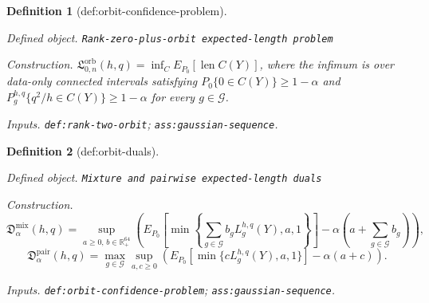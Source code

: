 \documentclass{article}
\newtheorem{definition}{Definition}
\begin{document}
\begin{definition}[def:orbit-confidence-problem]\label{def:orbit-confidence-problem}
\par\smallskip\noindent\emph{Defined object.} \texttt{Rank-\allowbreak{}zero-\allowbreak{}plus-\allowbreak{}orbit expected-\allowbreak{}length problem}
\par\smallskip\noindent\emph{Construction.} \(\mathfrak L_{0,n}^{\mathrm{orb}}(h,q)=\inf_C E_{P_0}[\operatorname{len}C(Y)]\), where the infimum is over data-only connected intervals satisfying \(P_0\{0\in C(Y)\}\ge1-\alpha\) and \(P_g^{h,q}\{q^2/h\in C(Y)\}\ge1-\alpha\) for every \(g\in\mathcal G\).
\par\smallskip\noindent\emph{Inputs.} \texttt{def:\allowbreak{}rank-\allowbreak{}two-\allowbreak{}orbit}; \texttt{ass:\allowbreak{}gaussian-\allowbreak{}sequence}.
\end{definition}

\begin{definition}[def:orbit-duals]\label{def:orbit-duals}
\par\smallskip\noindent\emph{Defined object.} \texttt{Mixture and pairwise expected-\allowbreak{}length duals}
\par\smallskip\noindent\emph{Construction.} \[\mathfrak D_{\alpha}^{\mathrm{mix}}(h,q)=\sup_{a\ge0,\,b\in\mathbb R_+^{64}}\left(E_{P_0}\!\left[\min\left\{\sum_{g\in\mathcal G}b_gL_g^{h,q}(Y),a,1\right\}\right]-\alpha\left(a+\sum_{g\in\mathcal G}b_g\right)\right),\] \[\mathfrak D_{\alpha}^{\mathrm{pair}}(h,q)=\max_{g\in\mathcal G}\sup_{a,c\ge0}\left(E_{P_0}[\min\{cL_g^{h,q}(Y),a,1\}]-\alpha(a+c)\right).\]
\par\smallskip\noindent\emph{Inputs.} \texttt{def:\allowbreak{}orbit-\allowbreak{}confidence-\allowbreak{}problem}; \texttt{ass:\allowbreak{}gaussian-\allowbreak{}sequence}.
\end{definition}
\end{document}
